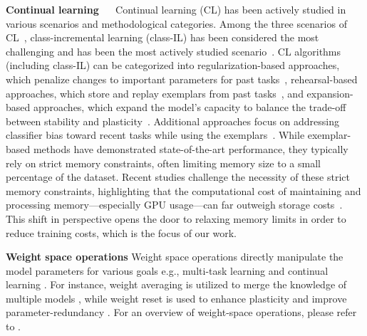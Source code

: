 \noindent\textbf{Continual learning}  \ \
Continual learning (CL) has been actively studied in various scenarios and methodological categories. Among the three scenarios of CL~\citep{van2019three}, class-incremental learning (class-IL) has been considered the most challenging and has been the most actively studied scenario~\citep{masana2022class}. CL algorithms (including class-IL) can be categorized into regularization-based approaches, which penalize changes to important parameters for past tasks~\citep{kirkpatrick2017overcoming, (mas)aljundi2018memory, cha2020cpr}, rehearsal-based approaches, which store and replay exemplars from past tasks~\citep{icarl, (tbbn)cha2023rebalancing}, and expansion-based approaches, which expand the model's capacity to balance the trade-off between stability and plasticity~\citep{der, foster}.
Additional approaches focus on addressing classifier bias toward recent tasks while using the exemplars~\citep{bic,wa}.
While exemplar-based methods have demonstrated state-of-the-art performance, they typically rely on strict memory constraints, often limiting memory size to a small percentage of the dataset. Recent studies challenge the necessity of these strict memory constraints, highlighting that the computational cost of maintaining and processing memory—especially GPU usage—can far outweigh storage costs~\citep{prabhu2023computationally, chavan2023towards,Harun_2023_CVPR}. This shift in perspective opens the door to relaxing memory limits in order to reduce training costs, which is the focus of our work.

\noindent\textbf{Weight space operations} Weight space operations directly manipulate the model parameters for various goals e.g., multi-task learning \citep{yu2024language} and continual learning \citep{marouf2025weighted,marczak2025magmax}. For instance, weight averaging is utilized to merge the knowledge of multiple models \citep{ilharco2022editing,jang2025model}, while weight reset is used to enhance plasticity \citep{dohare2024loss} and improve parameter-redundancy \citep{yadav2024ties}. For an overview of weight-space operations, please refer to .


